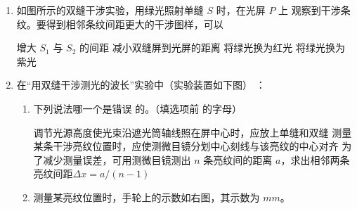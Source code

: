 

\begin{enumerate}
	\item
{}
如图所示的双缝干涉实验，用绿光照射单缝 $ S $ 时，在光屏 $ P $ 上
观察到干涉条纹。要得到相邻条纹间距更大的干涉图样，可以  
\begin{figure}[h!]
	\centering
	
\end{figure}

\fourchoices
{增大 $ S_{1} $ 与 $ S_{2} $ 的间距}
{减小双缝屏到光屏的距离}
{将绿光换为红光}
{将绿光换为紫光}



\item 
{}
在“用双缝干涉测光的波长”实验中（实验装置如下图）
：
\begin{enumerate}
	\item
下列说法哪一个是错误 \underlinegap 的。（填选项前
的字母）


\threechoices
{调节光源高度使光束沿遮光筒轴线照在屏中心时，应放上单缝和双缝}
{测量某条干涉亮纹位置时，应使测微目镜分划中心刻线与该亮纹的中心对齐}
{为了减少测量误差，可用测微目镜测出 $ n $ 条亮纹间的距离 $ a $，求出相邻两条亮纹间距$ \Delta x=a/(n-1) $}

\item 
测量某亮纹位置时，手轮上的示数如右图，其示数为 \underlinegap $ mm $。

	
\end{enumerate}
\begin{figure}[h!]
	\centering
\begin{subfigure}{0.4\linewidth}
	\centering
	 
	\caption{}\label{}
\end{subfigure}
\begin{subfigure}{0.4\linewidth}
	\centering
	 
	\caption{}\label{}
\end{subfigure}


\end{figure}
\end{enumerate}
